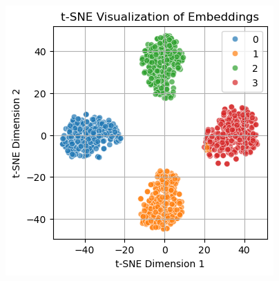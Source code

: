 \begin{figure}[!htbp]
    \centering
    \includegraphics[width=\linewidth]{../plots/unsupervised-orientation/tsne.png}
    \caption{ }
    \label{fig:tSNE}
\end{figure}